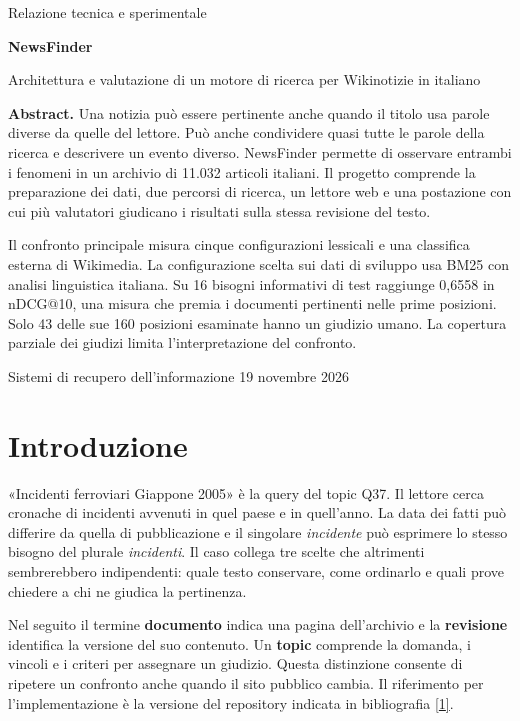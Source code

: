 \documentclass[11pt,a4paper]{article}
\newcommand{\citeproc}[2]{\hyperlink{#1}{#2}}
\begin{document}
\thispagestyle{empty}
\vspace*{12mm}
{\large Relazione tecnica e sperimentale\par}
\vspace{6mm}
{\LARGE\bfseries NewsFinder\par}
\vspace{2mm}
{\Large Architettura e valutazione di un motore di ricerca per Wikinotizie in italiano\par}
\vspace{8mm}

\textbf{Abstract.} Una notizia può essere pertinente anche quando il titolo usa parole diverse da quelle del lettore. Può anche condividere quasi tutte le parole della ricerca e descrivere un evento diverso. NewsFinder permette di osservare entrambi i fenomeni in un archivio di 11.032 articoli italiani. Il progetto comprende la preparazione dei dati, due percorsi di ricerca, un lettore web e una postazione con cui più valutatori giudicano i risultati sulla stessa revisione del testo.

Il confronto principale misura cinque configurazioni lessicali e una classifica esterna di Wikimedia. La configurazione scelta sui dati di sviluppo usa BM25 con analisi linguistica italiana. Su 16 bisogni informativi di test raggiunge 0,6558 in nDCG@10, una misura che premia i documenti pertinenti nelle prime posizioni. Solo 43 delle sue 160 posizioni esaminate hanno un giudizio umano. La copertura parziale dei giudizi limita l'interpretazione del confronto.

\vfill
{\small\sffamily Sistemi di recupero dell’informazione \hfill 19 novembre 2026}

\clearpage
\tableofcontents

\section{Introduzione}\label{introduzione}

«Incidenti ferroviari Giappone 2005» è la query del topic Q37. Il lettore cerca cronache di incidenti avvenuti in quel paese e in quell'anno. La data dei fatti può differire da quella di pubblicazione e il singolare \emph{incidente} può esprimere lo stesso bisogno del plurale \emph{incidenti}. Il caso collega tre scelte che altrimenti sembrerebbero indipendenti: quale testo conservare, come ordinarlo e quali prove chiedere a chi ne giudica la pertinenza.

Nel seguito il termine \textbf{documento} indica una pagina dell'archivio e la \textbf{revisione} identifica la versione del suo contenuto. Un \textbf{topic} comprende la domanda, i vincoli e i criteri per assegnare un giudizio. Questa distinzione consente di ripetere un confronto anche quando il sito pubblico cambia. Il riferimento per l'implementazione è la versione del repository indicata in bibliografia \citeproc{ref-repo}{{[}1{]}}.
\end{document}

